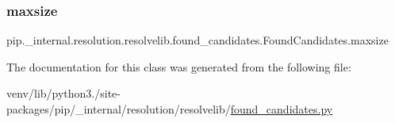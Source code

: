 \subsubsection{\texorpdfstring{maxsize}{maxsize}}
{\footnotesize\ttfamily pip.\+\_\+internal.\+resolution.\+resolvelib.\+found\+\_\+candidates.\+Found\+Candidates.\+maxsize\hspace{0.3cm}{\ttfamily [static]}}



The documentation for this class was generated from the following file\+:\begin{DoxyCompactItemize}
\item 
venv/lib/python3./site-\/packages/pip/\+\_\+internal/resolution/resolvelib/\hyperlink{found__candidates_8py}{found\+\_\+candidates.\+py}\end{DoxyCompactItemize}
